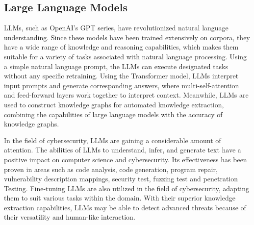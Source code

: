 \subsection{Large Language Models}
LLMs\cite{radford2018improving,radford2018improving,ouyang2022training}, such as OpenAI's GPT series, have revolutionized natural language understanding. Since these models have been trained extensively on corpora, they have a wide range of knowledge and reasoning capabilities, which makes them suitable for a variety of tasks associated with natural language processing. Using a simple natural language prompt, the LLMs can execute designated tasks without any specific retraining. Using the Transformer\cite{vaswani2017attention} model, LLMs interpret input prompts and generate corresponding answers, where multi-self-attention and feed-forward layers work together to interpret context.
Meanwhile, LLMs are used to construct knowledge graphs for automated knowledge extraction\cite{zhu2023llms,pan2023unifying}, combining the capabilities of large language models with the accuracy of knowledge graphs.

In the field of cybersecurity, LLMs are gaining a considerable amount of attention. The abilities of LLMs to understand, infer, and generate text have a positive impact on computer science and cybersecurity. Its effectiveness has been proven in areas such as code analysis\cite{sun2023gpt,kang2023large}, code generation\cite{liu2023improving}, program repair\cite{wei2023copiloting}, vulnerability description mappings\cite{liu-etal-2023-end}, security test\cite{zhang2023well}, fuzzing test\cite{zhao2023understanding} and penetration Testing\cite{deng2023pentestgpt}. Fine-tuning LLMs are also utilized in the field of cybersecurity, adapting them to suit various tasks within the domain.
With their superior knowledge extraction capabilities, LLMs may be able to detect advanced threats because of their versatility and human-like interaction.





